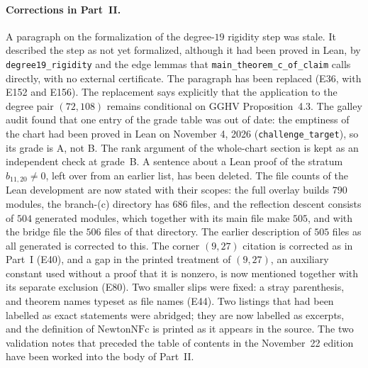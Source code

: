 \documentclass[a4paper,11pt]{article}
\theoremstyle{jsplain}
\theoremstyle{jsdef}
\theoremstyle{jsrem}
\begin{document}
\paragraph{Corrections in Part~II.} A paragraph on the formalization of the degree-$19$ rigidity step was stale. It described the step as not yet formalized, although it had been proved in Lean, by \texttt{degree19\_\allowbreak{}rigidity} and the edge lemmas that \texttt{main\_\allowbreak{}theorem\_\allowbreak{}c\_\allowbreak{}of\_\allowbreak{}claim} calls directly, with no external certificate. The paragraph has been replaced (E36, with E152 and E156). The replacement says explicitly that the application to the degree pair $(72,108)$ remains conditional on GGHV Proposition~4.3. The galley audit found that one entry of the grade table was out of date: the emptiness of the chart had been proved in Lean on November 4, 2026 (\texttt{challenge\_\allowbreak{}target}), so its grade is A, not B. The rank argument of the whole-chart section is kept as an independent check at grade~B. A sentence about a Lean proof of the stratum $b_{11,20}\ne0$, left over from an earlier list, has been deleted. The file counts of the Lean development are now stated with their scopes: the full overlay builds $790$ modules, the branch-(c) directory has $686$ files, and the reflection descent consists of $504$ generated modules, which together with its main file make $505$, and with the bridge file the $506$ files of that directory. The earlier description of $505$ files as all generated is corrected to this. The corner $(9,27)$ citation is corrected as in Part~I (E40), and a gap in the printed treatment of $(9,27)$, an auxiliary constant used without a proof that it is nonzero, is now mentioned together with its separate exclusion (E80). Two smaller slips were fixed: a stray parenthesis, and theorem names typeset as file names (E44). Two listings that had been labelled as exact statements were abridged; they are now labelled as excerpts, and the definition of $\mathrm{NewtonNFc}$ is printed as it appears in the source. The two validation notes that preceded the table of contents in the November~22 edition have been worked into the body of Part~II.
\end{document}
